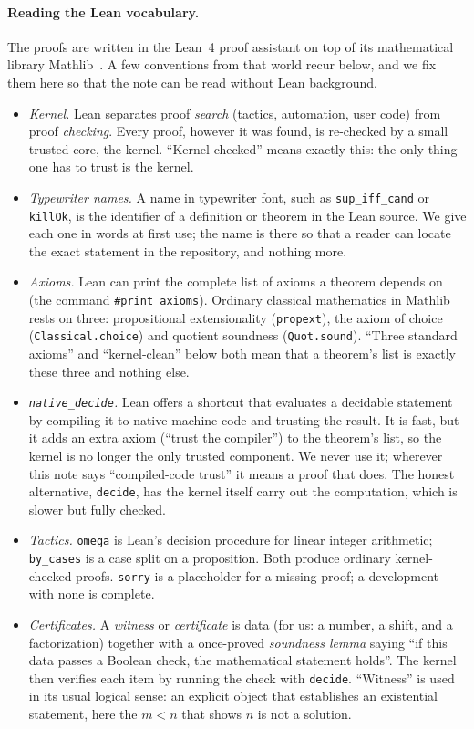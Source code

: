 \documentclass[11pt]{article}
\begin{document}
\paragraph{Reading the Lean vocabulary.}
The proofs are written in the Lean~4 proof assistant on top of its mathematical library Mathlib~\cite{mathlib}. A few conventions from that world recur below, and we fix them here so that the note can be read without Lean background.
\begin{itemize}
\item \emph{Kernel.} Lean separates proof \emph{search} (tactics, automation, user code) from proof \emph{checking}. Every proof, however it was found, is re-checked by a small trusted core, the kernel. ``Kernel-checked'' means exactly this: the only thing one has to trust is the kernel.
\item \emph{Typewriter names.} A name in typewriter font, such as \texttt{sup\_iff\_cand} or \texttt{killOk}, is the identifier of a definition or theorem in the Lean source. We give each one in words at first use; the name is there so that a reader can locate the exact statement in the repository, and nothing more.
\item \emph{Axioms.} Lean can print the complete list of axioms a theorem depends on (the command \verb|#print axioms|). Ordinary classical mathematics in Mathlib rests on three: propositional extensionality (\texttt{propext}), the axiom of choice (\texttt{Classical.choice}) and quotient soundness (\texttt{Quot.sound}). ``Three standard axioms'' and ``kernel-clean'' below both mean that a theorem's list is exactly these three and nothing else.
\item \emph{\texttt{native\_decide}.} Lean offers a shortcut that evaluates a decidable statement by compiling it to native machine code and trusting the result. It is fast, but it adds an extra axiom (``trust the compiler'') to the theorem's list, so the kernel is no longer the only trusted component. We never use it; wherever this note says ``compiled-code trust'' it means a proof that does. The honest alternative, \texttt{decide}, has the kernel itself carry out the computation, which is slower but fully checked.
\item \emph{Tactics.} \texttt{omega} is Lean's decision procedure for linear integer arithmetic; \texttt{by\_cases} is a case split on a proposition. Both produce ordinary kernel-checked proofs. \texttt{sorry} is a placeholder for a missing proof; a development with none is complete.
\item \emph{Certificates.} A \emph{witness} or \emph{certificate} is data (for us: a number, a shift, and a factorization) together with a once-proved \emph{soundness lemma} saying ``if this data passes a Boolean check, the mathematical statement holds''. The kernel then verifies each item by running the check with \texttt{decide}. ``Witness'' is used in its usual logical sense: an explicit object that establishes an existential statement, here the $m<n$ that shows $n$ is not a solution.

\end{itemize}
\end{document}

